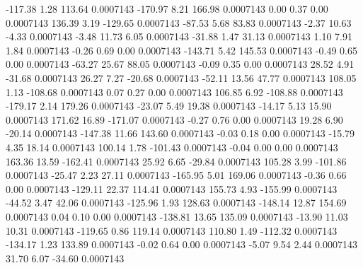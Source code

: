      -117.38        1.28      113.64     0.0007143
     -170.97        8.21      166.98     0.0007143
        0.00        0.37        0.00     0.0007143
      136.39        3.19     -129.65     0.0007143
      -87.53        5.68       83.83     0.0007143
       -2.37       10.63       -4.33     0.0007143
       -3.48       11.73        6.05     0.0007143
      -31.88        1.47       31.13     0.0007143
        1.10        7.91        1.84     0.0007143
       -0.26        0.69        0.00     0.0007143
     -143.71        5.42      145.53     0.0007143
       -0.49        0.65        0.00     0.0007143
      -63.27       25.67       88.05     0.0007143
       -0.09        0.35        0.00     0.0007143
       28.52        4.91      -31.68     0.0007143
       26.27        7.27      -20.68     0.0007143
      -52.11       13.56       47.77     0.0007143
      108.05        1.13     -108.68     0.0007143
        0.07        0.27        0.00     0.0007143
      106.85        6.92     -108.88     0.0007143
     -179.17        2.14      179.26     0.0007143
      -23.07        5.49       19.38     0.0007143
      -14.17        5.13       15.90     0.0007143
      171.62       16.89     -171.07     0.0007143
       -0.27        0.76        0.00     0.0007143
       19.28        6.90      -20.14     0.0007143
     -147.38       11.66      143.60     0.0007143
       -0.03        0.18        0.00     0.0007143
      -15.79        4.35       18.14     0.0007143
      100.14        1.78     -101.43     0.0007143
       -0.04        0.00        0.00     0.0007143
      163.36       13.59     -162.41     0.0007143
       25.92        6.65      -29.84     0.0007143
      105.28        3.99     -101.86     0.0007143
      -25.47        2.23       27.11     0.0007143
     -165.95        5.01      169.06     0.0007143
       -0.36        0.66        0.00     0.0007143
     -129.11       22.37      114.41     0.0007143
      155.73        4.93     -155.99     0.0007143
      -44.52        3.47       42.06     0.0007143
     -125.96        1.93      128.63     0.0007143
     -148.14       12.87      154.69     0.0007143
        0.04        0.10        0.00     0.0007143
     -138.81       13.65      135.09     0.0007143
      -13.90       11.03       10.31     0.0007143
     -119.65        0.86      119.14     0.0007143
      110.80        1.49     -112.32     0.0007143
     -134.17        1.23      133.89     0.0007143
       -0.02        0.64        0.00     0.0007143
       -5.07        9.54        2.44     0.0007143
       31.70        6.07      -34.60     0.0007143
